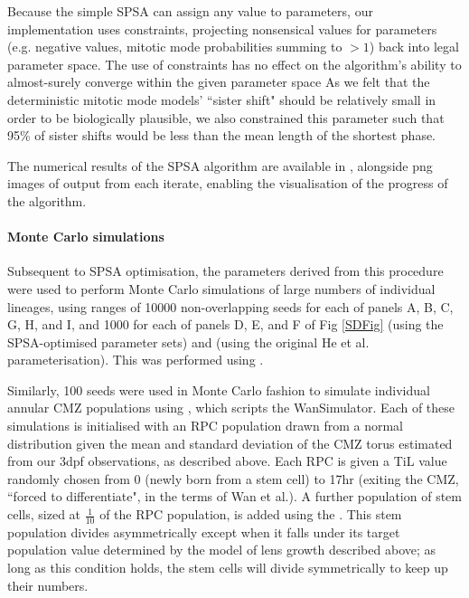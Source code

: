  Because the simple SPSA can assign any value to parameters, our implementation uses constraints, projecting nonsensical values for parameters (e.g. negative values, mitotic mode probabilities summing to $>1$) back into legal parameter space. The use of constraints has no effect on the algorithm's ability to almost-surely converge within the given parameter space \cite{Sadegh1997} As we felt that the deterministic mitotic mode models' ``sister shift" should be relatively small in order to be biologically plausible, we also constrained this parameter such that 95\% of sister shifts would be less than the mean length of the shortest phase.
 
 The numerical results of the SPSA algorithm are available in , alongside png images of output from each iterate, enabling the visualisation of the progress of the algorithm.
 
\paragraph{Monte Carlo simulations}
 Subsequent to SPSA optimisation, the parameters derived from this procedure were used to perform Monte Carlo simulations of large numbers of individual lineages, using ranges of 10000 non-overlapping seeds for each of panels A, B, C, G, H, and I, and 1000 for each of panels D, E, and F of Fig \ref{SDFig} (using the SPSA-optimised parameter sets) and  (using the original He et al. parameterisation). This was performed using .
 
 Similarly, 100 seeds were used in Monte Carlo fashion to simulate individual annular CMZ populations using , which scripts the WanSimulator. Each of these simulations is initialised with an RPC population drawn from a normal distribution given the mean and standard deviation of the CMZ torus estimated from our 3dpf observations, as described above. Each RPC is given a TiL value randomly chosen from 0 (newly born from a stem cell) to 17hr (exiting the CMZ, ``forced to differentiate", in the terms of Wan et al.). A further population of stem cells, sized at $\frac{1}{10}$ of the RPC population, is added using the . This stem population divides asymmetrically except when it falls under its target population value determined by the model of lens growth described above; as long as this condition holds, the stem cells will divide symmetrically to keep up their numbers.
 
